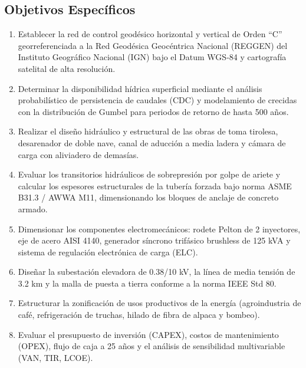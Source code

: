 \documentclass[11pt,a4paper]{report}
\begin{document}
\subsection{Objetivos Específicos}
\begin{enumerate}
    \item Establecer la red de control geodésico horizontal y vertical de Orden ``C'' georreferenciada a la Red Geodésica Geocéntrica Nacional (REGGEN) del Instituto Geográfico Nacional (IGN) bajo el Datum WGS-84 y cartografía satelital de alta resolución.
    \item Determinar la disponibilidad hídrica superficial mediante el análisis probabilístico de persistencia de caudales (CDC) y modelamiento de crecidas con la distribución de Gumbel para periodos de retorno de hasta 500 años.
    \item Realizar el diseño hidráulico y estructural de las obras de toma tirolesa, desarenador de doble nave, canal de aducción a media ladera y cámara de carga con aliviadero de demasías.
    \item Evaluar los transitorios hidráulicos de sobrepresión por golpe de ariete y calcular los espesores estructurales de la tubería forzada bajo norma ASME B31.3 / AWWA M11, dimensionando los bloques de anclaje de concreto armado.
    \item Dimensionar los componentes electromecánicos: rodete Pelton de 2 inyectores, eje de acero AISI 4140, generador síncrono trifásico brushless de 125 kVA y sistema de regulación electrónica de carga (ELC).
    \item Diseñar la subestación elevadora de 0.38/10 kV, la línea de media tensión de 3.2 km y la malla de puesta a tierra conforme a la norma IEEE Std 80.
    \item Estructurar la zonificación de usos productivos de la energía (agroindustria de café, refrigeración de truchas, hilado de fibra de alpaca y bombeo).
    \item Evaluar el presupuesto de inversión (CAPEX), costos de mantenimiento (OPEX), flujo de caja a 25 años y el análisis de sensibilidad multivariable (VAN, TIR, LCOE).
\end{enumerate}
\end{document}
